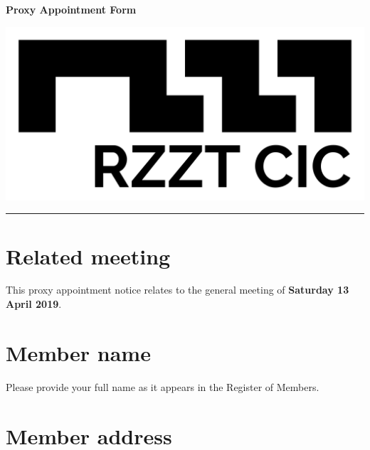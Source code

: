 \documentclass[a4paper,10pt]{article}
\begin{document}
\thispagestyle{firstpage}

\begin{Form}

\begin{minipage}[b]{0.75\textwidth}
  \raggedright
  \LARGE{\textbf{Proxy Appointment Form}}
  \vspace{0.05em}
\end{minipage}
%
\begin{minipage}[b]{0.25\textwidth}
  \raggedleft
  \includegraphics[width=1\textwidth]{logo-black.jpg}
\end{minipage}

\hrule

\vspace{2em}


\section{Related meeting}

This proxy appointment notice relates to the general meeting of \textbf{Saturday 13 April 2019}.

\section{Member name}

Please provide your full name as it appears in the Register of Members.

\begin{framed}%
  \TextField[width=\textwidth,maxlen=75,donotscroll=true,name=forename]{ }%
\end{framed}%

\section{Member address}


\end{Form}
\end{document}
